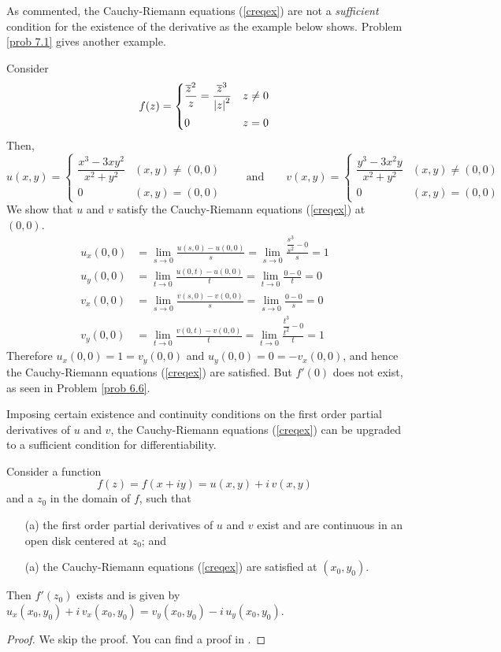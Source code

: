 \medskip

As commented, the Cauchy-Riemann equations (\ref{creqex}) are not a \emph{sufficient} condition for the existence of the derivative as the example below shows. Problem \ref{prob 7.1} gives another example.
\begin{example}\label{onlynecescr}
Consider
\[f(z) = \begin{cases}\dfrac{\overline{z}^2}{z} = \dfrac{\overline{z}^3}{\left\lvert z\right\rvert^2} & z \neq 0\\[1em] 0 & z = 0 \end{cases}\]
Then,
\[u(x,y) = \begin{cases}\dfrac{x^3 - 3xy^2}{x^2 + y^2} & (x,y) \neq (0,0)\\[1em] 0 & (x,y) = (0,0) \end{cases} \qquad \text{and} \qquad v(x,y) = \begin{cases}\dfrac{y^3 - 3x^2y}{x^2 + y^2} & (x,y) \neq (0,0)\\[1em] 0 & (x,y) = (0,0) \end{cases}\]
We show that $u$ and $v$ satisfy the Cauchy-Riemann equations (\ref{creqex}) at $(0,0)$.
\begin{align*}
u_x(0,0) &= \lim_{s \to 0}\frac{u(s,0) - u(0,0)}{s} = \lim_{s \to 0}\frac{\dfrac{s^3}{s^2} - 0}{s} = 1\\[0.5em]
u_y(0,0) &= \lim_{t \to 0}\frac{u(0,t) - u(0,0)}{t} = \lim_{t \to 0}\frac{0 - 0}{t} = 0  \\[1em]
v_x(0,0) &= \lim_{s \to 0}\frac{v(s,0) - v(0,0)}{s} = \lim_{s \to 0}\frac{0 - 0}{s} = 0\\[0.5em]
v_y(0,0) &= \lim_{t \to 0}\frac{v(0,t) - v(0,0)}{t} = \lim_{t \to 0}\frac{\dfrac{t^3}{t^2} - 0}{t} = 1
\end{align*}
Therefore $u_x(0,0) = 1 = v_y(0,0)$ and $u_y(0,0) = 0 = -v_x(0,0)$, and hence the Cauchy-Riemann equations (\ref{creqex}) are satisfied. But $f'(0)$ does not exist, as seen in Problem \ref{prob 6.6}.
\end{example}

\medskip

Imposing certain existence and continuity conditions on the first order partial derivatives of $u$ and $v$, the Cauchy-Riemann equations (\ref{creqex}) can be upgraded to a sufficient condition for differentiability.
\begin{theorem}\label{crsuff}
Consider a function \[f(z) = f(x + iy) = u(x,y) + i\,v(x,y)\]
and a $z_0$ in the domain of $f$, such that
\begin{itemize}
\item[(a)] the first order partial derivatives of $u$ and $v$ exist and are continuous in an open disk centered at $z_0$; and
\item[(a)] the Cauchy-Riemann equations (\ref{creqex}) are satisfied at $(x_0,y_0)$.
\end{itemize}
Then $f'(z_0)$ exists and is given by $u_x(x_0,y_0) + i\,v_x(x_0,y_0) = v_y(x_0,y_0)-i\,u_y(x_0,y_0)$.
\end{theorem}
\begin{proof}
We skip the proof. You can find a proof in \cite[Section~22, Page~66]{brown2009complex}.
\end{proof}


